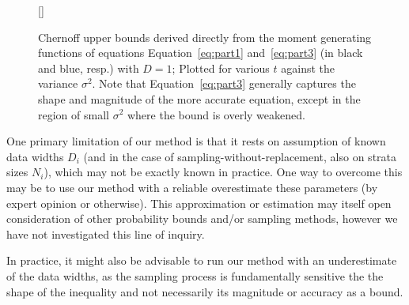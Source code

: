 \documentclass[]{interact}
\DeclareMathOperator{\pr}{\mathbb{P}}
\theoremstyle{plain}%
\theoremstyle{definition}
\theoremstyle{remark}
\begin{document}
\begin{figure}
[\FBwidth]
{\caption{Chernoff upper bounds derived directly from the moment generating functions of equations Equation~\eqref{eq:part1} and~\eqref{eq:part3} (in black and blue, resp.) with $D=1$; Plotted for various $t$ against the variance $\sigma^2$.
Note that Equation~\eqref{eq:part3} generally captures the shape and magnitude of the more accurate equation, except in the region of small $\sigma^2$ where the bound is overly weakened.}
\label{fig:graph2}}
{}
\end{figure}


One primary limitation of our method is that it rests on assumption of known data widths $D_i$ (and in the case of sampling-without-replacement, also on strata sizes $N_i$), which may not be exactly known in practice.
One way to overcome this may be to use our method with a reliable overestimate these parameters (by expert opinion or otherwise). This approximation or estimation may itself open consideration of other probability bounds and/or sampling methods, however we have not investigated this line of inquiry. 

In practice, it might also be advisable to run our method with an underestimate of the data widths, as the sampling process is fundamentally sensitive the the shape of the inequality and not necessarily its magnitude or accuracy as a bound.

\end{document}
